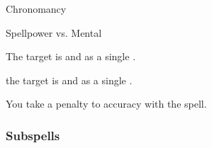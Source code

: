 \newpage
\begin{spellsection}{Chronomancy}

\begin{spellheader}
\end{spellheader}

\begin{spellcontent}

\begin{spelltargetinginfo}




\end{spelltargetinginfo}


\begin{spelleffects}




\begin{spellattack}{Spellpower vs. Mental}


\hit
The target is  and  as a single .



\crit
the target is  and  as a single .



\end{spellattack}





\end{spelleffects}

\end{spellcontent}
\begin{spellfooter}


\end{spellfooter}
\begin{spellsubcontent}


\begin{spellcantrip}

You take a  penalty to accuracy with the spell.

\end{spellcantrip}


\end{spellsubcontent}
\end{spellsection}


\subsubsection{Subspells}


